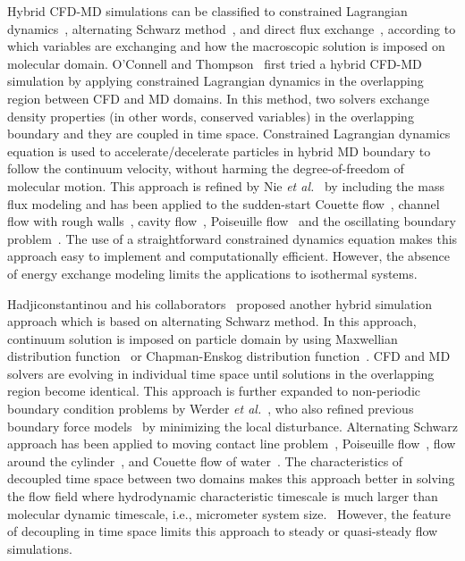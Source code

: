 \documentclass[preprint,12pt]{elsarticle}
\begin{document}
Hybrid CFD-MD simulations can be classified to constrained Lagrangian dynamics~\cite{Thompson,Nie,Nie_cavity,Cui,Wang,Yen,Liu}, alternating Schwarz method~\cite{Hadjicon1,Hadjicon2,Hadjicon3,Werder,Kotsalis}, and direct flux exchange~\cite{Flekkoy,Wagner,Delgado1,USHER,Time_Mechanism,Giupponi}, according to which variables are exchanging and how the macroscopic solution is imposed on molecular domain. O'Connell and Thompson~\cite{Thompson} first tried a hybrid CFD-MD simulation by applying constrained Lagrangian dynamics in the overlapping region between CFD and MD domains. In this method, two solvers exchange density properties (in other words, conserved variables) in the overlapping boundary and they are coupled in time space. Constrained Lagrangian dynamics equation is used to accelerate/decelerate particles in hybrid MD boundary to follow the continuum velocity, without harming the degree-of-freedom of molecular motion. This approach is refined by Nie {\it{et al.}}~\cite{Nie} by including the mass flux modeling and has been applied to the sudden-start Couette flow~\cite{Thompson}, channel flow with rough walls~\cite{Nie}, cavity flow~\cite{Nie_cavity}, Poiseuille flow~\cite{Yen} and the oscillating boundary problem~\cite{Wang,Liu}. The use of a straightforward constrained dynamics equation makes this approach easy to implement and computationally efficient. However, the absence of energy exchange modeling limits the applications to isothermal systems.~\cite{Flekkoy}

Hadjiconstantinou and his collaborators~\cite{Hadjicon1,Hadjicon2,Hadjicon3} proposed another hybrid simulation approach which is based on alternating Schwarz method. In this approach, continuum solution is imposed on particle domain by using Maxwellian distribution function~\cite{Hadjicon2} or Chapman-Enskog distribution function~\cite{Garcia}. CFD and MD solvers are evolving in individual time space until solutions in the overlapping region become identical. This approach is further expanded to non-periodic boundary condition problems by Werder {\it{et al.}}~\cite{Werder}, who also refined previous boundary force models~\cite{Thompson,Flekkoy,Delgado1,Nie} by minimizing the local disturbance. Alternating Schwarz approach has been applied to moving contact line problem~\cite{Hadjicon2}, Poiseuille flow~\cite{Hadjicon3}, flow around the cylinder~\cite{Werder}, and Couette flow of water~\cite{Kotsalis}. The characteristics of decoupled time space between two domains makes this approach better in solving the flow field where hydrodynamic characteristic timescale is much larger than molecular dynamic timescale, i.e., micrometer system size.~\cite{Hadjicon2} However, the feature of decoupling in time space limits this approach to steady or quasi-steady flow simulations.~\cite{Flekkoy}
\end{document}
